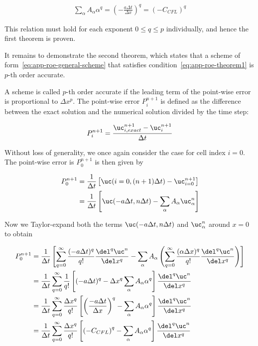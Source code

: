 \begin{align}
\sum_\alpha A_\alpha \alpha^q = \left( - \frac{a \Delta t}{\Delta x}\right)^q = (- C_{CFL})^q
\end{align}

This relation must hold for each exponent $0 \leq q \leq p$ individually, and hence the first
theorem is proven.


It remains to demonstrate the second theorem, which states that a scheme of
form~\ref{eq:app-roe-general-scheme} that satisfies condition~\ref{eq:app-roe-theorem1} is $p$-th
order accurate.

A scheme is called $p$-th order accurate if the leading term of the point-wise error is proportional
to $\Delta x^p$. The point-wise error $P_i^{n+1}$ is defined as the difference between the exact
solution and the numerical solution divided by the time step:

\begin{align}
 P_i^{n+1} = \frac{\uc_{i,exact}^{n+1} - \uc_i^{n+1}}{\Delta t}
\end{align}

Without loss of generality, we once again consider the case for cell index $i = 0$. The point-wise
error is $P_0^{n+1}$ is then given by

\begin{align}
P_0^{n+1}
&= \frac{1}{\Delta t} \left[
    \uc(i=0, (n+1) \Delta t) - \uc_{i=0}^{n+1}
    \right] \\
&= \frac{1}{\Delta t} \left[
    \uc(-a\Delta t, n \Delta t) - \sum_\alpha A_\alpha \uc_\alpha^n
    \right]
\end{align}

Now we Taylor-expand both the terms $\uc(-a \Delta t, n \Delta t)$ and $\uc_\alpha^n$ around $x =
0$ to obtain


\begin{align}
P_0^{n+1}
&= \frac{1}{\Delta t} \left[
    \sum_{q = 0}^\infty \frac{(-a \Delta t)^q}{q!} \frac{\del^q \uc^n}{\del x^q} -
    \sum_\alpha A_\alpha
        \left( \sum_{q=0}^\infty \frac{(\alpha \Delta x)^q}{q!} \frac{\del^q \uc^n}{\del x^q}
\right)
    \right] \\
&= \frac{1}{\Delta t} \sum_{q = 0}^\infty  \frac{1}{q!} \left[
    (-a \Delta t)^q - \Delta x^q \sum_\alpha A_\alpha \alpha^q
    \right] \frac{\del^q \uc^n}{\del x^q}  \\
&= \frac{1}{\Delta t} \sum_{q = 0}^\infty  \frac{\Delta x^q}{q!} \left[
    \left(\frac{-a \Delta t}{\Delta x} \right)^q - \sum_\alpha A_\alpha \alpha^q
    \right] \frac{\del^q \uc^n}{\del x^q} \\
&= \frac{1}{\Delta t} \sum_{q = 0}^\infty  \frac{\Delta x^q}{q!} \left[
    \left(- C_{CFL} \right)^q - \sum_\alpha A_\alpha \alpha^q
    \right] \frac{\del^q \uc^n}{\del x^q}
\end{align}


